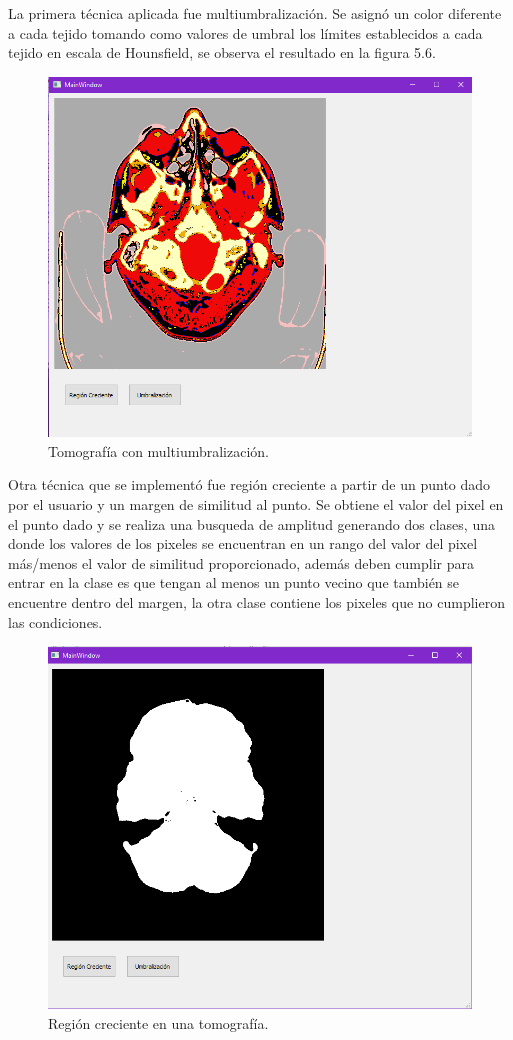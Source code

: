\documentclass[12pt]{report}
\begin{document}
La primera técnica aplicada fue multiumbralización. Se asignó un color diferente a cada tejido tomando como valores de umbral los límites establecidos a cada tejido en escala de Hounsfield, se observa el resultado en la figura 5.6.

\begin{figure}[H]
\centering
\includegraphics[width = 12 cm, height = 10 cm]{umbralizado}
\caption{Tomografía con multiumbralización.}
\end{figure}

Otra técnica que se implementó fue región creciente a partir de un punto dado por el usuario  y un margen de similitud al punto. Se obtiene el valor del pixel en el punto dado y se realiza una busqueda de amplitud generando dos clases, una donde los valores de los pixeles se encuentran en un rango del valor del pixel más/menos el valor de similitud proporcionado, además deben cumplir para entrar en la clase es que tengan al menos un punto vecino que  también se encuentre dentro del margen, la otra clase contiene los pixeles que no cumplieron las condiciones.

\begin{figure}[H]
\centering
\includegraphics[width = 12 cm, height = 10 cm]{regionu}
\caption{Región creciente en una tomografía.}
\end{figure}




\end{document}

